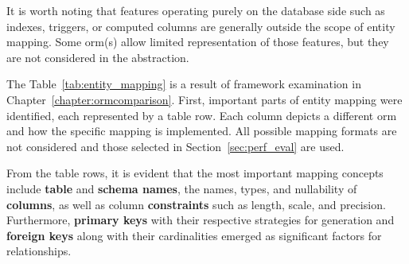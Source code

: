It is worth noting that features operating purely on the database side such as indexes, triggers, or computed columns are generally outside the scope of entity mapping. Some \acrshort{orm}(s) allow limited representation of those features, but they are not considered in the abstraction.

The Table~\ref{tab:entity_mapping} is a result of framework examination in Chapter~\ref{chapter:ormcomparison}. First, important parts of entity mapping were identified, each represented by a table row. Each column depicts a different \acrshort{orm} and how the specific mapping is implemented. All possible mapping formats are not considered and those selected in Section~\ref{sec:perf_eval} are used. 

From the table rows, it is evident that the most important mapping concepts include \textbf{table} and \textbf{schema names}, the names, types, and nullability of \textbf{columns}, as well as column \textbf{constraints} such as length, scale, and precision. Furthermore, \textbf{primary keys} with their respective strategies for generation and \textbf{foreign keys} along with their cardinalities emerged as significant factors for relationships.

